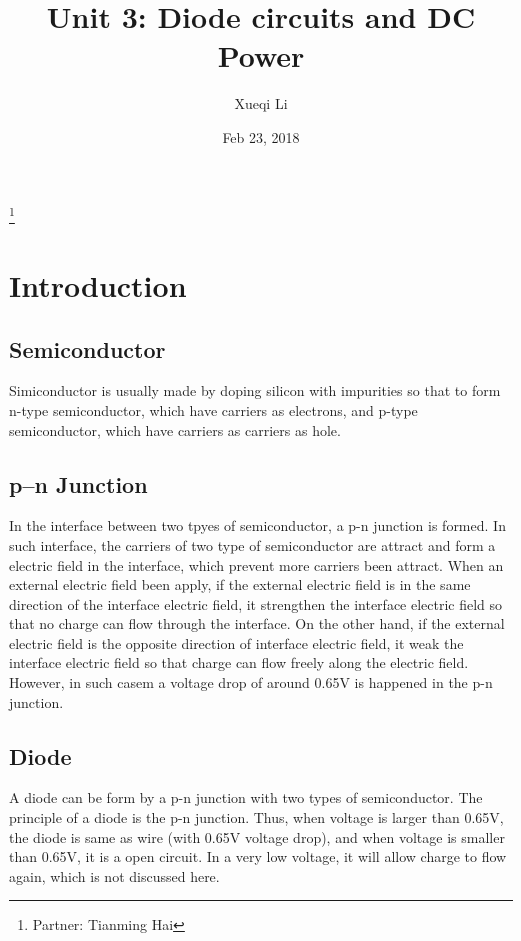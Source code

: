 \documentclass[aps,prl,reprint]{revtex4-1}
\begin{document}
\title{Unit 3: Diode circuits and DC Power}
\author{Xueqi Li}
\thanks{Partner: Tianming Hai}
\noaffiliation
\date{Feb 23, 2018}



\maketitle

\section{Introduction}  
    \subsection{Semiconductor}
    Simiconductor is usually made by doping silicon with impurities so that to form n-type semiconductor, which have carriers as electrons, and p-type semiconductor, which have carriers as carriers as hole.
    \subsection{p–n Junction}
    In the interface between two tpyes of semiconductor, a p-n junction is formed. In such interface, the carriers of two type of semiconductor are attract and form a electric field in the interface, which prevent more carriers been attract. When an external electric field been apply, if the external electric field is in the same direction of the interface electric field, it strengthen the interface electric field so that no charge can flow through the interface. On the other hand, if the external electric field is the opposite direction of interface electric field, it weak the interface electric field so that charge can flow freely along the electric field. However, in such casem a voltage drop of around 0.65V is happened in the p-n junction.
    \subsection{Diode}
    A diode can be form by a p-n junction with two types of semiconductor. The principle of a diode is the p-n junction. Thus, when voltage is larger than 0.65V, the diode is same as wire (with 0.65V voltage drop), and when voltage is smaller than 0.65V, it is a open circuit. In a very low voltage, it will allow charge to flow again, which is not discussed here.
\end{document}
